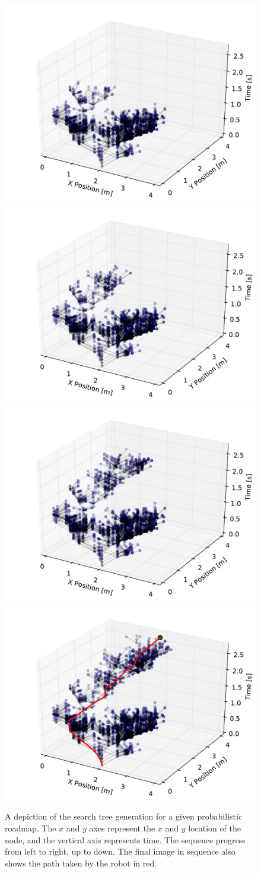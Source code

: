 \begin{figure}[h!]
    \includegraphics[width=0.32\linewidth]{figs/tree_5} \\
    \includegraphics[width=0.32\linewidth]{figs/tree_6}
    \includegraphics[width=0.32\linewidth]{figs/tree_7}
    \includegraphics[width=0.32\linewidth]{figs/tree_8}

    \caption{A depiction of the search tree generation for a given
    probabilistic roadmap. The $x$ and $y$ axes represent the $x$ and $y$
location of the node, and the vertical axis represents time. The sequence
progress from left to right, up to down. The final image in sequence also shows
the path taken by the robot in red.}

    \label{fig:tree}
\end{figure}

